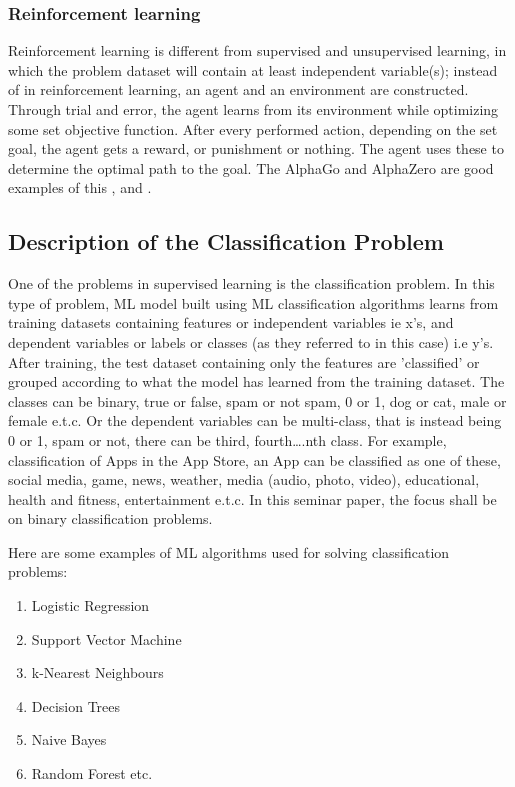\documentclass[conference]{IEEEtran}
\begin{document}
\subsubsection{Reinforcement learning}
Reinforcement learning is different from supervised and unsupervised learning, in which the problem dataset will contain at least independent variable(s); instead of in reinforcement learning, an agent and an environment are constructed. Through trial and error, the agent learns from its environment while optimizing some set objective function. After every performed action, depending on the set goal, the agent gets a reward, or punishment or nothing. The agent uses these to determine the optimal path to the goal. The AlphaGo and AlphaZero are good examples of this \cite{bb3}, and \cite{bb5}.

\subsection{Description of the Classification Problem}
One of the problems in supervised learning is the classification problem. In this type of problem, ML model built using ML classification algorithms learns from training datasets containing features or independent variables ie x's, and dependent variables or labels or classes (as they referred to in this case) i.e y's. After training, the test dataset containing only the features are 'classified' or grouped according to what the model has learned from the training dataset. The classes can be binary, true or false, spam or not spam, 0 or 1, dog or cat, male or female e.t.c. Or the dependent variables can be multi-class, that is instead being 0 or 1, spam or not, there can be third, fourth….nth class. For example, classification of Apps in the App Store, an App can be classified as one of these, social media, game, news, weather, media (audio, photo, video), educational, health and fitness, entertainment e.t.c. In this seminar paper, the focus shall be on binary classification problems.

Here are some examples of ML algorithms used for solving classification problems:
\begin{enumerate}
\item Logistic Regression
\item Support Vector Machine
\item k-Nearest Neighbours
\item Decision Trees
\item Naive Bayes
\item Random Forest etc.
\end{enumerate}
\end{document}
